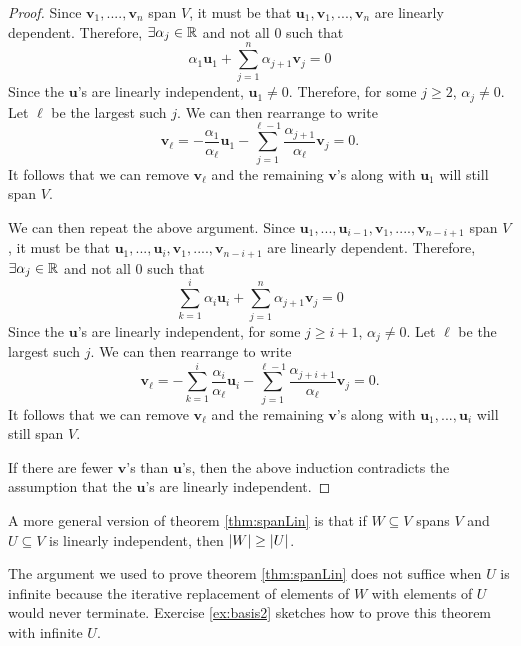 \begin{proof}
  Since $\mathbf{v}_1, ...., \mathbf{v}_n$ span $V$, it must be that 
  $\mathbf{u}_1, \mathbf{v}_1, ... , \mathbf{v}_n$ are linearly
  dependent. Therefore, $\exists \alpha_j \in \mathbb{R}$ and not all $0$ such that 
  \[ \alpha_1 \mathbf{u}_1 + \sum_{j=1}^n \alpha_{j+1} \mathbf{v}_j =
  0 \]
  Since the $\mathbf{u}$'s are linearly independent, $\mathbf{u}_1
  \neq 0$. Therefore, for some $j \geq 2$, $\alpha_j \neq 0$. Let
  $\ell$ be the largest such $j$. We can then rearrange to write
  \[ \mathbf{v}_\ell = -\frac{\alpha_1}{\alpha_\ell} \mathbf{u}_1 -
  \sum_{j=1}^{\ell-1} \frac{\alpha_{j+1}}{\alpha_\ell} \mathbf{v}_j = 0. \]
  It follows that we can remove $\mathbf{v}_\ell$ and the remaining
  $\mathbf{v}$'s along with $\mathbf{u}_1$ will still span $V$. 

  We can then repeat the above argument.  Since $\mathbf{u}_1, ...,
  \mathbf{u}_{i-1}, \mathbf{v}_1, ...., \mathbf{v}_{n-i+1}$ span $V$,
  it must be that $\mathbf{u}_1, ...,
  \mathbf{u}_{i}, \mathbf{v}_1, ...., \mathbf{v}_{n-i+1}$ are
  linearly dependent. Therefore, $\exists \alpha_j \in \mathbb{R}$ and not all
  $0$ such that
  \[ \sum_{k=1}^i \alpha_i \mathbf{u}_i + \sum_{j=1}^n \alpha_{j+1}
  \mathbf{v}_j = 0 \] 
  Since the $\mathbf{u}$'s are linearly
  independent, for some $j \geq i+1$, $\alpha_j \neq 0$. Let $\ell$ be
  the largest such $j$. We can then rearrange to write
  \[ \mathbf{v}_\ell = -\sum_{k=1}^i \frac{\alpha_i}{\alpha_\ell} \mathbf{u}_i -
  \sum_{j=1}^{\ell-1} \frac{\alpha_{j+i+1}}{\alpha_\ell} \mathbf{v}_j = 0. \]
  It follows that we can remove $\mathbf{v}_\ell$ and the remaining
  $\mathbf{v}$'s along with $\mathbf{u}_1, ... , \mathbf{u}_i$ will
  still span $V$. 

  If there are fewer $\mathbf{v}$'s than $\mathbf{u}$'s, then the
  above induction contradicts the assumption that the $\mathbf{u}$'s
  are linearly independent.
\end{proof}
\begin{remark}
  A more general version of theorem \ref{thm:spanLin} is that if $W
  \subseteq V$ spans $V$ and $U \subseteq V$ is linearly independent,
  then $\left\vert {W} \right\vert \geq \left\vert {U} \right\vert$. 

  The argument we used to prove theorem \ref{thm:spanLin} does not
  suffice when $U$ is infinite because the iterative replacement of
  elements of $W$ with elements of $U$ would never terminate. Exercise
  \ref{ex:basis2} sketches how to prove this theorem with infinite
  $U$. 
\end{remark}
